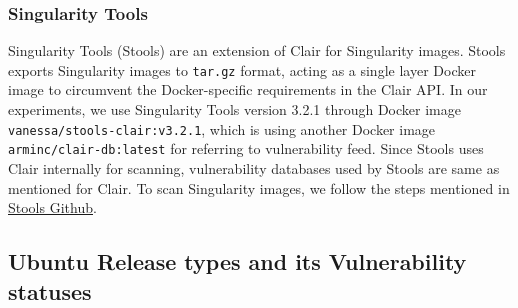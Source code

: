 \documentclass[a4paper,num-refs]{oup-contemporary}
\begin{document}
\subsubsection{Singularity Tools}

Singularity Tools (Stools)
are an extension of Clair for Singularity images. Stools
exports Singularity images to \texttt{tar.gz} format, acting as a single layer Docker image
to circumvent the Docker-specific requirements in the Clair API.
In our experiments, we use Singularity Tools version 3.2.1 through Docker
image
\texttt{vanessa/stools-clair:v3.2.1}, which is using another Docker
image \texttt{arminc/clair-db:latest} for referring to vulnerability feed.
Since Stools uses Clair internally for scanning, vulnerability databases used
by Stools are same as mentioned for Clair.
To scan Singularity images, we follow the steps mentioned in
\href{https://github.com/singularityhub/stools}{Stools Github}.

\subsection{Ubuntu Release types and its Vulnerability statuses}
\end{document}
